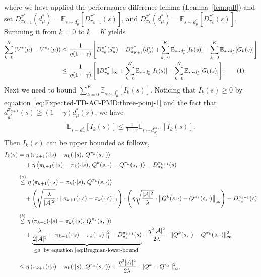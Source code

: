 \documentclass[10pt]{article}
\newcommand{\calA}{\mathcal{A}}
\newcommand{\E}{\mathbb{E}}
\newcommand{\ls}{\left}
\newcommand{\rs}{\right}
\newcommand\numberthis{\addtocounter{equation}{1}\tag{\theequation}}
\theoremstyle{plain}
\theoremstyle{definition}
\begin{document}
    where we have applied the performance difference lemma (Lemma~\ref{lem:pdl}) and set $D^{\pi^*}_{\pi_{k+1}}(d^*_\mu) = \E_{s\sim d^*_\mu} [D^{\pi^*}_{\pi_{k+1}}(s)]$, and  $D^{\pi^*}_{\pi_k}(d^*_\mu)=\E_{s\sim d^*_\mu} [D^{\pi^*}_{\pi_k}(s)]$. Summing it from $k=0$ to $k=K$ yields
    \begin{align*}
        \sum_{k=0}^K \ls( V^*(\mu) - V^{\pi_k}(\mu) \rs) &\leq \frac{1}{\eta(1-\gamma)} \ls[ D^{\pi^*}_{\pi_0}(d^*_\mu) - D^{\pi^*}_{\pi_{K+1}}(d^*_\mu) + \sum_{k=0}^K \E_{s\sim d^*_\mu} [I_k(s)] - \sum_{k=0}^K \E_{s\sim d^*_\mu}[ G_k (s) ] \rs] \\
        &\leq \frac{1}{\eta(1-\gamma)} \ls[ \| D^{\pi^*}_{\pi_0} \|_\infty + \sum_{k=0}^K \E_{s\sim d^*_\mu} [I_k(s)] - \sum_{k=0}^K \E_{s\sim d^*_\mu}[ G_k (s) ] \rs]. \numberthis \label{eq:Xiao-bound-1}
    \end{align*}
    Next we need to bound 
    $\sum_{k=0}^{K} \E_{s\sim d^*_\mu} [I_k(s)]$. Noticing that $I_k(s) \geq 0$ by equation~\eqref{eq:Expected-TD-AC-PMD:three-poinj-1} and the fact that $d^{\pi_{k+1}}_{d^*_\mu}(s) \geq (1-\gamma) d^*_\mu(s)$, we have
    \begin{align*}
        \E_{s\sim d^*_\mu} [I_k(s)] \leq \frac{1}{1-\gamma} \E_{s\sim d^{\pi_{k+1}}_{d^*_\mu}} \ls[ I_k(s) \rs].
    \end{align*}
    Then $I_k(s)$ can be upper bounded as follows,
    \begin{align*}
        I_k(s) &= \eta \ls\langle \pi_{k+1}(\cdot|s) - \pi_k(\cdot|s), \, Q^{\pi_k}(s,\cdot) \rs\rangle \\
        &\;\;\;\;+ \eta \ls\langle \pi_{k+1}(\cdot|s) - \pi_k(\cdot|s), \, Q^k(s,\cdot) - Q^{\pi_k}(s,\cdot) \rs\rangle - D^{\pi_{k+1}}_{\pi_k}(s) \\[.5em]
        &\stackrel{(a)}{\leq} \eta \ls\langle \pi_{k+1}(\cdot|s) - \pi_k(\cdot|s), \, Q^{\pi_k}(s,\cdot) \rs\rangle \\
        &\;\;\;\; + \ls( \sqrt{\frac{\lambda}{|\calA|^2}} \cdot \| \pi_{k+1}(\cdot|s) - \pi_k(\cdot|s) \|_1 \rs) \cdot \ls( \eta \sqrt{\frac{|\calA|^2}{\lambda}} \cdot \ls\| Q^k(s,\cdot) - Q^{\pi_k}(s,\cdot) \rs\|_\infty \rs) - D^{\pi_{k+1}}_{\pi_k}(s) \\[.5em]
        &\stackrel{(b)}{\leq} \eta \ls\langle \pi_{k+1}(\cdot|s) - \pi_k(\cdot|s), \, Q^{\pi_k}(s,\cdot) \rs\rangle \\
        &\;\;\;\; + \underbrace{\frac{\lambda}{2|\calA|^2} \cdot \ls\| \pi_{k+1}(\cdot|s) - \pi_k(\cdot|s) \rs\|_1^2 - D^{\pi_{k+1}}_{\pi_k}(s)}_{\leq 0 \mbox{\small \; by equation~\eqref{eq:Bregman-lower-bound}}} + \frac{\eta^2 |\calA|^2}{2\lambda} \cdot \| Q^k(s,\cdot) - Q^{\pi_k}(s,\cdot) \|_\infty^2 \\[.5em]
        & \leq \eta \ls\langle \pi_{k+1}(\cdot|s) - \pi_k(\cdot|s), \, Q^{\pi_k}(s,\cdot) \rs\rangle + \frac{\eta^2 |\calA|^2}{2\lambda} \cdot \| Q^k - Q^{\pi_k} \|_\infty^2,
    \end{align*}
\end{document}
